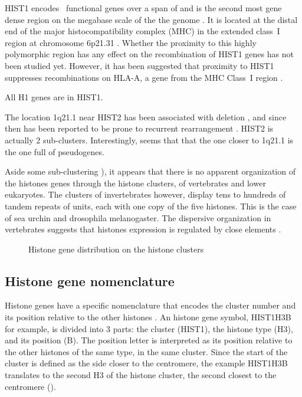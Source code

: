 \documentclass[10pt,a4paper,twocolumn,article]{memoir}
\begin{document}
      HIST1 encodes \CodingGenesInHISTOne{}~functional genes over a span of \HISTOneSpan{}
      and is the second most gene dense region on the megabase scale of the the
      genome \citep{MHC-III-analysis}. It is located at the distal end of the major
      histocompatibility complex (MHC) in the extended class~I region at chromosome 6p21.31
      \citep{MHC-I-transcript, MHC-complete-sequencing-1999}. Whether the proximity to this
      highly polymorphic region has any effect on the recombination of HIST1 genes has not
      been studied yet. However, it has been suggested that proximity to HIST1 suppresses
      recombinations on HLA-A, a gene from the MHC Class~I region \citep{MHC-repressed-by-HIST}.

      All H1 genes are in HIST1.


      The location 1q21.1 near HIST2 has been associated with deletion
      \citep{HISTTwo-prone-deletion-discovery}, and since then has been reported to be prone
      to recurrent rearrangement \citep{HISTTwo-prone-deletion-focus}. HIST2 is actually
      2 sub-clusters. Interestingly, seems that that the one closer to 1q21.1 is the one
      full of pseudogenes.

      Aside some sub-clustering ), it appears that
      there is no apparent organization
      of the histones genes through the histone clusters, of vertebrates and
      lower eukaryotes. The clusters of invertebrates however, display tens to hundreds
      of tandem repeats of units, each with one copy of the five histones. This is the
      case of sea urchin and drosophila melanogaster. The dispersive organization
      in vertebrates suggests that histones expression is regulated by close elements
      \citep{close-regulators}.

      \begin{figure}
        \centering
        \caption{Histone gene distribution on the histone clusters}
        \label{fig:cluster-organization}
      \end{figure}

    \subsection{Histone gene nomenclature}
      Histone genes have a specific nomenclature that encodes the cluster number and its
      position relative to the other histones \citep{Marzluff02}. An histone gene
      symbol, HIST1H3B for example, is divided into 3 parts: the cluster (HIST1),
      the histone type (H3), and its position (B). The position letter is interpreted as
      its position relative to the other histones of the same type, in the same cluster.
      Since the start of the cluster is defined as the side closer to the centromere, the
      example HIST1H3B translates to the second H3 of the histone cluster, the
      second closest to the centromere ().
\end{document}
